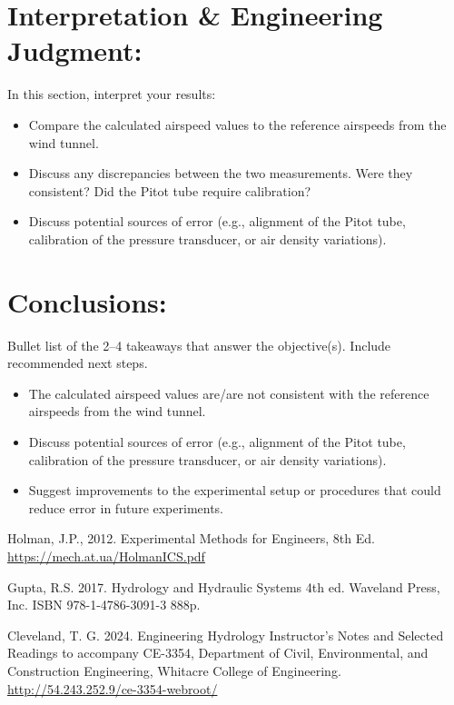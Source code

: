 \documentclass[12pt]{article}
\begin{document}
\section{Interpretation \& Engineering Judgment:} 
In this section, interpret your results:
\begin{itemize}
\item Compare the calculated airspeed values to the reference airspeeds from the wind tunnel.
\item Discuss any discrepancies between the two measurements. Were they consistent? Did the Pitot tube require calibration?
\item Discuss potential sources of error (e.g., alignment of the Pitot tube, calibration of the pressure transducer, or air density variations).
\end{itemize}
\clearpage

\section{Conclusions:} 
Bullet list of the 2–4 takeaways that answer the objective(s). Include recommended next steps.
\begin{itemize}
\item The calculated airspeed values are/are not consistent with the reference airspeeds from the wind tunnel.
\item Discuss potential sources of error (e.g., alignment of the Pitot tube, calibration of the pressure transducer, or air density variations).
\item Suggest improvements to the experimental setup or procedures that could reduce error in future experiments.
\end{itemize}
\clearpage

\begin{thebibliography}{}

Holman, J.P., 2012. Experimental Methods for Engineers, 8th Ed. 
\url{https://mech.at.ua/HolmanICS.pdf}

Gupta, R.S. 2017. Hydrology and Hydraulic Systems 4th ed. Waveland Press, Inc. ISBN 978-1-4786-3091-3 888p.

Cleveland, T. G. 2024. Engineering Hydrology Instructor's Notes and Selected Readings to accompany CE-3354, Department of Civil, Environmental, and Construction Engineering, Whitacre College of Engineering. \url{http://54.243.252.9/ce-3354-webroot/}

\end{thebibliography}
\clearpage
\end{document}
